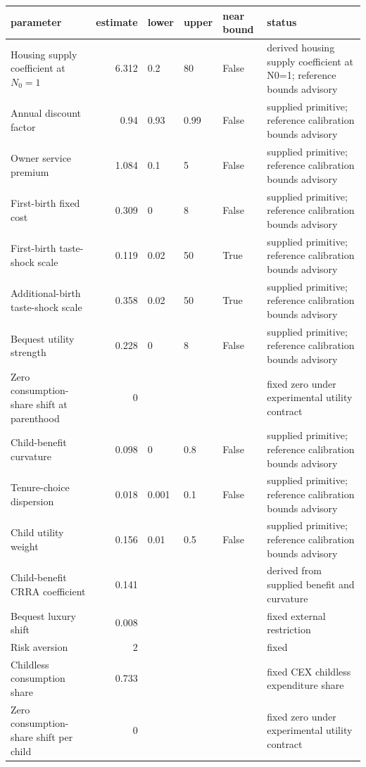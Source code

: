 \begingroup\small
\setlength{\tabcolsep}{3pt}
\renewcommand{\arraystretch}{1.04}
\begin{tabularx}{\linewidth}{XrXXXX}
\toprule
parameter & estimate & lower & upper & near bound & status \\
\midrule
Housing supply coefficient at $N_0=1$ & 6.312 & 0.2 & 80 & False & derived housing supply coefficient at N0=1; reference bounds advisory \\
Annual discount factor & 0.94 & 0.93 & 0.99 & False & supplied primitive; reference calibration bounds advisory \\
Owner service premium & 1.084 & 0.1 & 5 & False & supplied primitive; reference calibration bounds advisory \\
First-birth fixed cost & 0.309 & 0 & 8 & False & supplied primitive; reference calibration bounds advisory \\
First-birth taste-shock scale & 0.119 & 0.02 & 50 & True & supplied primitive; reference calibration bounds advisory \\
Additional-birth taste-shock scale & 0.358 & 0.02 & 50 & True & supplied primitive; reference calibration bounds advisory \\
Bequest utility strength & 0.228 & 0 & 8 & False & supplied primitive; reference calibration bounds advisory \\
Zero consumption-share shift at parenthood & 0 &  &  &  & fixed zero under experimental utility contract \\
Child-benefit curvature & 0.098 & 0 & 0.8 & False & supplied primitive; reference calibration bounds advisory \\
Tenure-choice dispersion & 0.018 & 0.001 & 0.1 & False & supplied primitive; reference calibration bounds advisory \\
Child utility weight & 0.156 & 0.01 & 0.5 & False & supplied primitive; reference calibration bounds advisory \\
Child-benefit CRRA coefficient & 0.141 &  &  &  & derived from supplied benefit and curvature \\
Bequest luxury shift & 0.008 &  &  &  & fixed external restriction \\
Risk aversion & 2 &  &  &  & fixed \\
Childless consumption share & 0.733 &  &  &  & fixed CEX childless expenditure share \\
Zero consumption-share shift per child & 0 &  &  &  & fixed zero under experimental utility contract \\

\end{tabularx}
